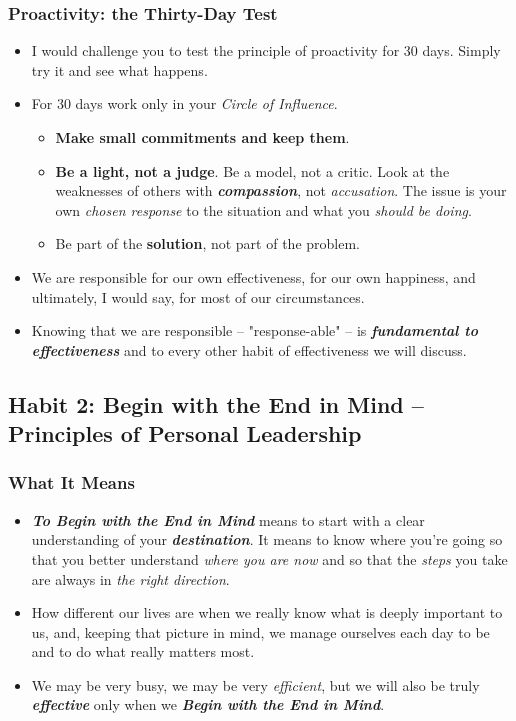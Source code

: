\documentclass[11pt]{article}
\begin{document}
\subsubsection{Proactivity: the Thirty-Day Test}
\begin{itemize}
\item I would challenge you to test the principle of proactivity for 30 days. Simply try it and see what
happens. 

\item For 30 days work only in your \emph{Circle of Influence}. 
\begin{itemize}
\item \textbf{Make small commitments and keep them}.
\item \textbf{Be a light, not a judge}. Be a model, not a critic.  Look at the weaknesses of others with \emph{\textbf{compassion}}, not \emph{accusation}. The issue is your own \emph{chosen response} to the situation and what you \emph{should be doing}.
\item Be part of the \textbf{solution}, not part of the problem.
\end{itemize}
 
 \item We are responsible for our own effectiveness, for our own happiness, and ultimately, I would say, for most of our circumstances.
 
 \item Knowing that we are responsible -- "response-able" -- is \emph{\textbf{fundamental to effectiveness}} and to every other habit of effectiveness we will discuss.
\end{itemize}
\subsection{Habit 2: Begin with the End in Mind -- Principles of Personal Leadership}
\subsubsection{What It Means}
\begin{itemize}
\item \emph{\textbf{To Begin with the End in Mind}} means to start with a clear understanding of your \emph{\textbf{destination}}. It means to know where you're going so that you better understand \emph{where you are now} and so that the \emph{steps} you take are always in \emph{the right direction}.

\item How different our lives are when we really know what is deeply important to us, and, keeping that picture in mind, we manage ourselves each day to be and to do what really matters most.

\item We may be very busy, we may be very \emph{efficient}, but we will also be truly \emph{\textbf{effective}} only when we \emph{\textbf{Begin with the End in Mind}}.
\end{itemize}
\end{document}
